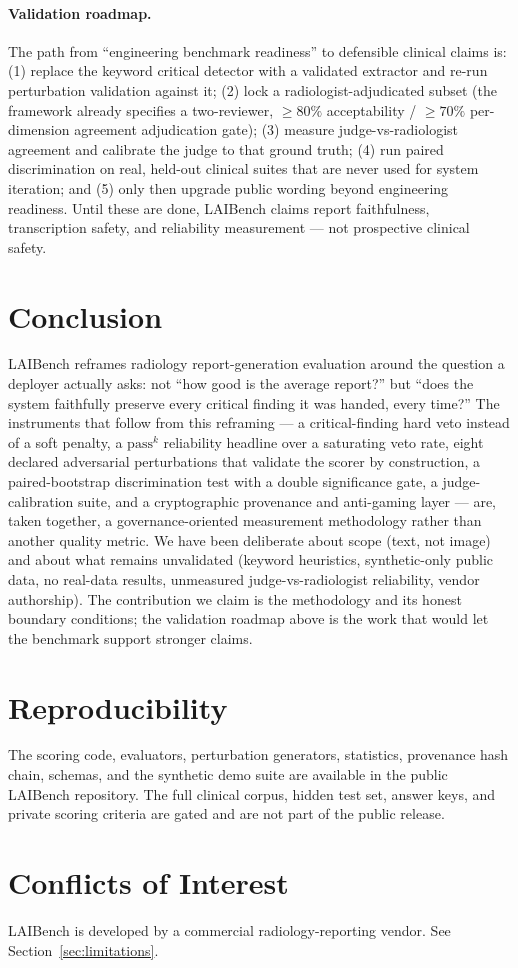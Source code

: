 \documentclass[11pt]{article}
\newcommand{\passk}{$\mathrm{pass}^{k}$}
\begin{document}
\paragraph{Validation roadmap.} The path from ``engineering benchmark readiness''
to defensible clinical claims is: (1) replace the keyword critical detector with
a validated extractor and re-run perturbation validation against it; (2) lock a
radiologist-adjudicated subset (the framework already specifies a two-reviewer,
$\ge80\%$ acceptability / $\ge70\%$ per-dimension agreement adjudication gate);
(3) measure judge-vs-radiologist agreement and calibrate the judge to that ground
truth; (4) run paired discrimination on real, held-out clinical suites that are
never used for system iteration; and (5) only then upgrade public wording beyond
engineering readiness. Until these are done, LAIBench claims report faithfulness,
transcription safety, and reliability measurement --- not prospective clinical
safety.

\section{Conclusion}

LAIBench reframes radiology report-generation evaluation around the question a
deployer actually asks: not ``how good is the average report?'' but ``does the
system faithfully preserve every critical finding it was handed, every time?''
The instruments that follow from this reframing --- a critical-finding hard veto
instead of a soft penalty, a \passk{} reliability headline over a saturating veto
rate, eight declared adversarial perturbations that validate the scorer by
construction, a paired-bootstrap discrimination test with a double significance
gate, a judge-calibration suite, and a cryptographic provenance and anti-gaming
layer --- are, taken together, a governance-oriented measurement methodology
rather than another quality metric. We have been deliberate about scope (text,
not image) and about what remains unvalidated (keyword heuristics, synthetic-only
public data, no real-data results, unmeasured judge-vs-radiologist reliability,
vendor authorship). The contribution we claim is the methodology and its honest
boundary conditions; the validation roadmap above is the work that would let the
benchmark support stronger claims.

\section*{Reproducibility}
The scoring code, evaluators, perturbation generators, statistics, provenance
hash chain, schemas, and the synthetic demo suite are available in the public
LAIBench repository. The full clinical corpus, hidden test set, answer keys, and
private scoring criteria are gated and are not part of the public release.

\section*{Conflicts of Interest}
LAIBench is developed by a commercial radiology-reporting vendor. See
Section~\ref{sec:limitations}.



\end{document}
